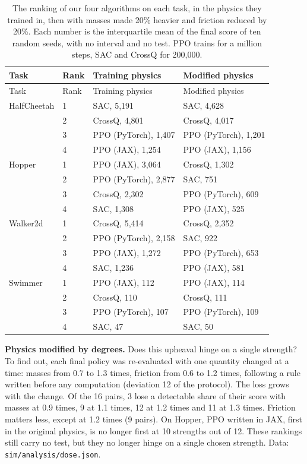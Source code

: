 \documentclass[11pt,a4paper]{article}
\begin{document}
\begin{longtable}[]{@{}llll@{}}
\caption{The ranking of our four algorithms on each task, in the physics
they trained in, then with masses made 20\% heavier and friction reduced
by 20\%. Each number is the interquartile mean of the final score of ten
random seeds, with no interval and no test. PPO trains for a million
steps, SAC and CrossQ for 200,000.}\tabularnewline
\toprule\noalign{}
Task & Rank & Training physics & Modified physics \\
\midrule\noalign{}
\endfirsthead
\toprule\noalign{}
Task & Rank & Training physics & Modified physics \\
\midrule\noalign{}
\endhead
\bottomrule\noalign{}
\endlastfoot
HalfCheetah & 1 & SAC, 5,191 & SAC, 4,628 \\
& 2 & CrossQ, 4,801 & CrossQ, 4,017 \\
& 3 & PPO (PyTorch), 1,407 & PPO (PyTorch), 1,201 \\
& 4 & PPO (JAX), 1,254 & PPO (JAX), 1,156 \\
Hopper & 1 & PPO (JAX), 3,064 & CrossQ, 1,302 \\
& 2 & PPO (PyTorch), 2,877 & SAC, 751 \\
& 3 & CrossQ, 2,302 & PPO (PyTorch), 609 \\
& 4 & SAC, 1,308 & PPO (JAX), 525 \\
Walker2d & 1 & CrossQ, 5,414 & CrossQ, 2,352 \\
& 2 & PPO (PyTorch), 2,158 & SAC, 922 \\
& 3 & PPO (JAX), 1,272 & PPO (PyTorch), 653 \\
& 4 & SAC, 1,236 & PPO (JAX), 581 \\
Swimmer & 1 & PPO (JAX), 112 & PPO (JAX), 114 \\
& 2 & CrossQ, 110 & CrossQ, 111 \\
& 3 & PPO (PyTorch), 107 & PPO (PyTorch), 109 \\
& 4 & SAC, 47 & SAC, 50 \\
\end{longtable}

\textbf{Physics modified by degrees.} Does this upheaval hinge on a
single strength? To find out, each final policy was re-evaluated with
one quantity changed at a time: masses from 0.7 to 1.3 times, friction
from 0.6 to 1.2 times, following a rule written before any computation
(deviation 12 of the protocol). The loss grows with the change. Of the
16 pairs, 3 lose a detectable share of their score with masses at 0.9
times, 9 at 1.1 times, 12 at 1.2 times and 11 at 1.3 times. Friction
matters less, except at 1.2 times (9 pairs). On Hopper, PPO written in
JAX, first in the original physics, is no longer first at 10 strengths
out of 12. These rankings still carry no test, but they no longer hinge
on a single chosen strength. Data: \texttt{sim/analysis/dose.json}.
\end{document}
